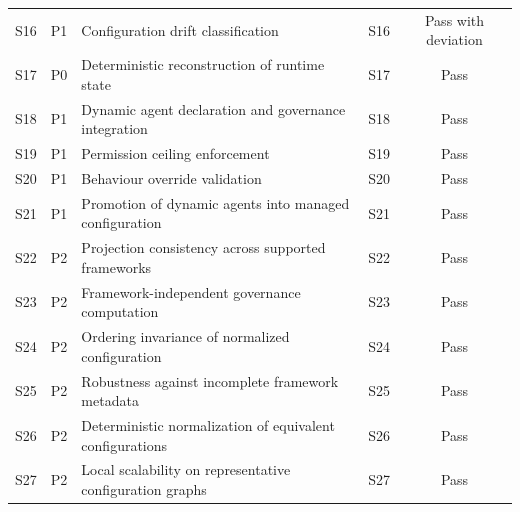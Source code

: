 \documentclass[10pt]{article}
\begin{document}
\begin{longtable}{ccp{8.5cm}cc}
	S16 & P1 & Configuration drift classification & S16 & Pass with deviation \\
	S17 & P0 & Deterministic reconstruction of runtime state & S17 & Pass \\
	S18 & P1 & Dynamic agent declaration and governance integration & S18 & Pass \\
	S19 & P1 & Permission ceiling enforcement & S19 & Pass \\
	S20 & P1 & Behaviour override validation & S20 & Pass \\
	S21 & P1 & Promotion of dynamic agents into managed configuration & S21 & Pass \\
	S22 & P2 & Projection consistency across supported frameworks & S22 & Pass \\
	S23 & P2 & Framework-independent governance computation & S23 & Pass \\
	S24 & P2 & Ordering invariance of normalized configuration & S24 & Pass \\
	S25 & P2 & Robustness against incomplete framework metadata & S25 & Pass \\
	S26 & P2 & Deterministic normalization of equivalent configurations & S26 & Pass \\
	S27 & P2 & Local scalability on representative configuration graphs & S27 & Pass \\
	
\end{longtable}
\end{document}
